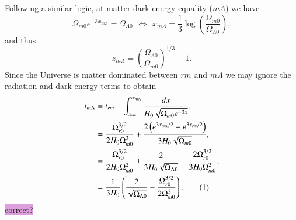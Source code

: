 \documentclass{aa}
\newcommand\numberthis{\addtocounter{equation}{1}\tag{\theequation}}
\begin{document}
Following a similar logic, at matter-dark energy equality ($m\Lambda$) we have
\begin{equation}
  \Omega_{m0}e^{-3x_{m\Lambda}} = \Omega_{\Lambda0}
  \hspace{5pt}\Leftrightarrow\hspace{5pt}
  x_{m\Lambda} = \frac{1}{3}\log\left(\frac{\Omega_{m0}}{\Omega_{\Lambda0}}\right),
\end{equation}
and thus
\begin{equation}
  z_{m\Lambda} = \left(\frac{\Omega_{\Lambda0}}{\Omega_{m0}}\right)^{1/3} - 1.
\end{equation}
Since the Universe is matter dominated between $rm$ and $m\Lambda$ we may ignore the radiation and dark energy terms to obtain
\begin{align*}
  t_{m\Lambda} &= t_{rm} + \int^{x_{m\Lambda}}_{x_{rm}}\frac{dx}{H_0\sqrt{\Omega_{m0}e^{-3x}}}, 
  \\
  &= \frac{\Omega_{r0}^{3/2}}{2H_0\Omega_{m0}^2} +\frac{2\left(e^{3x_{m\Lambda}/2} - e^{3x_{rm}/2} \right)}{3H_0\sqrt{\Omega_{m0}}}, 
  \\
  &= \frac{\Omega_{r0}^{3/2}}{2H_0\Omega_{m0}^2} + \frac{2}{3H_0\sqrt{\Omega_{\Lambda0}}} - \frac{2\Omega_{r0}^{3/2}}{3H_0\Omega_{m0}^2},
  \\
  &= \frac{1}{3H_0}\left(\frac{2}{\sqrt{\Omega_{\Lambda0}}} -\frac{\Omega_{r0}^{3/2}}{2\Omega_{m0}^2}\right). \numberthis
\end{align*}
\colorbox{Plum}{correct?}
\end{document}
